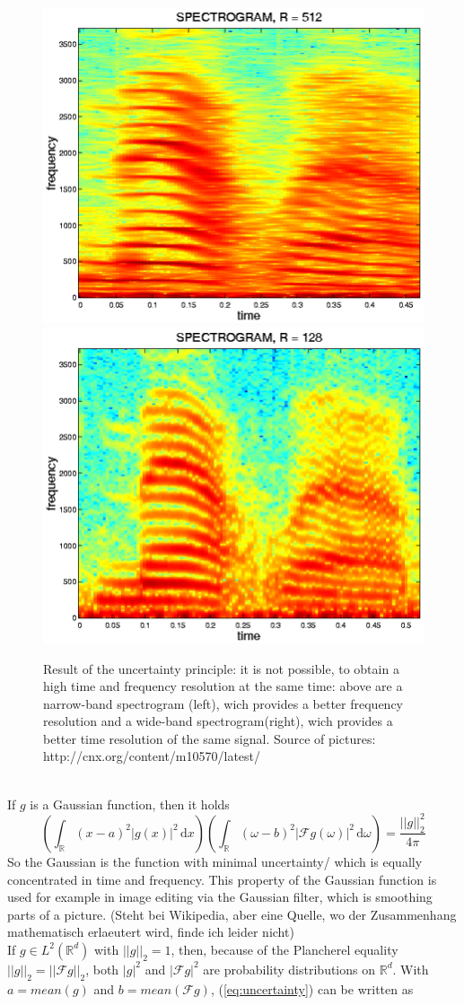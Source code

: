 \documentclass[a4paper, 11pt]{scrreprt}
\newcommand{\RR}{\mathbb{R}}
\newcommand{\FF}{\mathcal{F}}
\begin{document}
\begin{figure}[htpb]
	\centering
	\includegraphics[height=0.40\textwidth]{Narrow-band-spectrogram.png}
	\includegraphics[height=0.40\textwidth]{Wide-band-spectrogram.png}
	\caption{Result of the uncertainty principle: it is not possible, to obtain a high time and frequency resolution at the same time: above are a narrow-band spectrogram (left), wich provides a better frequency resolution and a wide-band spectrogram(right), wich provides a better time resolution of the same signal. Source of pictures: http://cnx.org/content/m10570/latest/} 
\end{figure}\\
If \(g\) is a Gaussian function, then it holds 
	\[\left(\int_{\RR} (x-a)^2|g(x)|^2 \,\mathrm{d}x\right)\left(\int_{\RR}(\omega-b)^2|\FF g(\omega)|^2\,\mathrm{d}\omega\right) = \frac{||g||_2^2}{4\pi}\]
So the Gaussian is the function with minimal uncertainty/  which is equally concentrated in time and frequency. This property of the Gaussian function is used for example in image editing via the Gaussian filter, which is smoothing parts of a picture. (Steht bei Wikipedia, aber eine Quelle, wo der Zusammenhang mathematisch erlaeutert wird, finde ich leider nicht)\\
If \(g\in L^2(\RR^d)\) with \(||g||_2=1\), then, because of the Plancherel equality \(||g||_2=||\FF g||_2\), both \(|g|^2\) and \(|\FF g|^2\) are probability distributions on \(\RR^d\). With \(a=mean(g)\) and \(b=mean(\FF g)\), (\ref{eq:uncertainty}) can be written as
\end{document}

